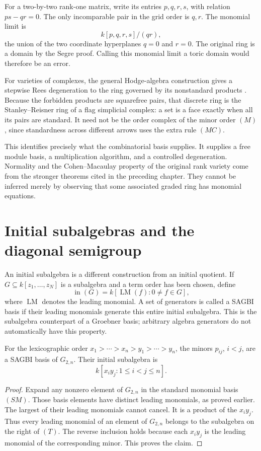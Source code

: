 For a two-by-two rank-one matrix,
write its entries \(p,q,r,s\), with
relation \(ps-qr=0\).  The only
incomparable pair in the grid order
is \(q,r\).  The monomial limit is
\[
 k[p,q,r,s]/(qr),
\]
the union of the two coordinate
hyperplanes \(q=0\) and \(r=0\).
The original ring is a domain by
the Segre proof.  Calling this
monomial limit a toric domain would
therefore be an error.

For varieties of complexes, the
general Hodge-algebra construction
gives a stepwise Rees degeneration
to the ring governed by its
nonstandard products
\cite[Section 3]{v2DEP1982}.
Because the forbidden products
are squarefree pairs, that
discrete ring is the
Stanley--Reisner ring of a flag
simplicial complex: a set is
a face exactly when all its
pairs are standard.  It need
not be the order complex of
the minor order \((M)\), since
standardness across different
arrows uses the extra rule
\((MC)\).

This identifies precisely what
the combinatorial basis supplies.
It supplies a free module basis,
a multiplication algorithm, and
a controlled degeneration.
Normality and the Cohen--Macaulay
property of the original rank
variety come from the stronger
theorems cited in the preceding
chapter.  They cannot be inferred
merely by observing that some
associated graded ring has
monomial equations.

\section{Initial subalgebras and the diagonal semigroup}

An initial subalgebra is a different
construction from an initial
quotient.  If \(G\subseteq k[z_1,\ldots,z_N]\)
is a subalgebra and a term order
has been chosen, define
\[
 \operatorname{in}(G)
   =k[\operatorname{LM}(f):0\ne f\in G],
\]
where \(\operatorname{LM}\) denotes
the leading monomial.  A set of
generators is called a SAGBI basis
if their leading monomials
generate this entire initial
subalgebra.  This is the
subalgebra counterpart of a
Groebner basis; arbitrary
algebra generators do not
automatically have this property.

\begin{proposition}
For the lexicographic order
\(x_1>\cdots>x_n>y_1>\cdots>y_n\),
the minors \(p_{ij}\), \(i<j\),
are a SAGBI basis of \(G_{2,n}\).
Their initial subalgebra is
\[
 k[x_i y_j:1\le i<j\le n].
 \tag{T}
\]
\end{proposition}
\begin{proof}
Expand any nonzero element of
\(G_{2,n}\) in the standard
monomial basis \((SM)\).
Those basis elements have
distinct leading monomials,
as proved earlier.  The
largest of their leading
monomials cannot cancel.
It is a product of the
\(x_i y_j\).  Thus every
leading monomial of an
element of \(G_{2,n}\)
belongs to the subalgebra
on the right of \((T)\).
The reverse inclusion holds
because each \(x_i y_j\)
is the leading monomial
of the corresponding
minor.  This proves the
claim.
\end{proof}

